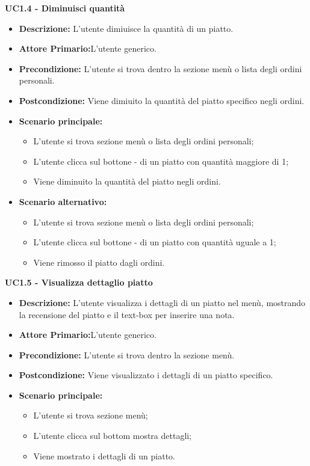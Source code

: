 \textbf{UC1.4 - Diminuisci quantità}
\begin{itemize}
    \item \textbf{Descrizione:} L'utente dimiuisce la quantità di un piatto.
    \item \textbf{Attore Primario:}L'utente generico.
    \item \textbf{Precondizione:} L'utente si trova dentro la sezione menù o lista degli ordini personali.
    \item \textbf{Postcondizione:} Viene dimiuito la quantità del piatto specifico negli ordini.
    \item \textbf{Scenario principale:}
    \begin{itemize}
        \item L'utente si trova sezione menù o lista degli ordini personali;
        \item L'utente clicca sul bottone - di un piatto con quantità maggiore di 1;
        \item Viene diminuito la quantità del piatto negli ordini.
    \end{itemize}
    \item \textbf{Scenario alternativo:}
    \begin{itemize}
        \item L'utente si trova sezione menù o lista degli ordini personali;
        \item L'utente clicca sul bottone - di un piatto con quantità uguale a 1;
        \item Viene rimosso il piatto dagli ordini.
    \end{itemize}
\end{itemize}
\textbf{UC1.5 - Visualizza dettaglio piatto}
\begin{itemize}
    \item \textbf{Descrizione:} L'utente visualizza i dettagli di un piatto nel menù, mostrando la recensione del piatto e il text-box per inserire una nota.
    \item \textbf{Attore Primario:}L'utente generico.
    \item \textbf{Precondizione:} L'utente si trova dentro la sezione menù.
    \item \textbf{Postcondizione:} Viene visualizzato i dettagli di un piatto specifico.
    \item \textbf{Scenario principale:}  
    \begin{itemize}
        \item L'utente si trova sezione menù;
        \item L'utente clicca sul bottom mostra dettagli;
        \item Viene mostrato i dettagli di un piatto.
    \end{itemize}
\end{itemize}

